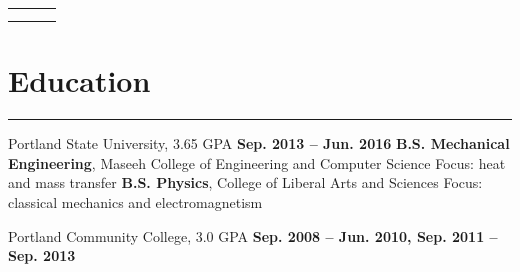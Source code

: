 

\newlength{\rcollength}\setlength{\rcollength}{3.0in}%
\begin{tabular} {
  p{}
  p{}
  p{}}
	\begin{flushleft}
		\address
	\end{flushleft}
	&
	\begin{center}
	\Large{\author}
	\end{center}
	&
	\begin{flushright}
		{\phnum}\\
 	    {\email} 	 
	\end{flushright}
\end{tabular}
\section{Education}
	\noindent\rule{\textwidth}{\hlinewidth}
	\begin{innerlist}
	\item Portland State University, 3.65 GPA	\hfill\textbf{Sep. 2013 -- Jun. 2016}
		\subitem \textbf{B.S. Mechanical Engineering}, Maseeh College of Engineering and Computer Science
		\subsubitem Focus: heat and mass transfer
		\subitem\textbf{B.S. Physics}, College of Liberal Arts and Sciences
		\subsubitem Focus: classical mechanics and electromagnetism
		\subitem 
	\item Portland Community College, 3.0 GPA	\hfill\textbf{Sep. 2008 -- Jun. 2010, Sep. 2011 -- Sep. 2013}
	\end{innerlist}
\vfill
